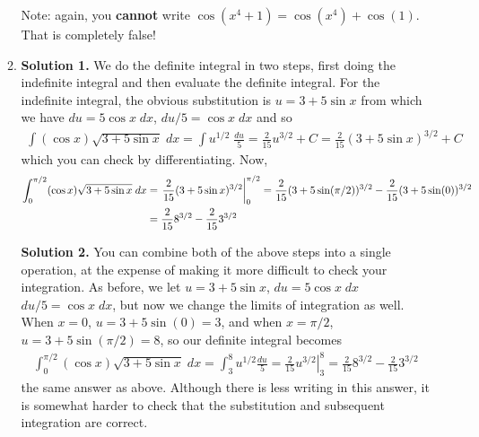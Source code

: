 \documentclass{article}
\begin{document}
\begin{enumerate}
\begin{enumerate}
    Note: again, you \textbf{cannot} write $\cos(x^4+1)=\cos(x^4)+\cos(1)$.
    That is completely false!
  \item \textbf{Solution 1.} We do the definite integral in two steps, first
    doing the indefinite integral and then evaluate the definite integral.
    For the indefinite integral, the obvious substitution is
    $u=3+5\sin x$ from which we have
    $du=5\cos x \; dx$, $du/5 = \cos x \; dx$ and so
    \begin{align*}
      \int (\cos x) \sqrt{3+5\sin x} \; dx
      = \int u^{1/2} \; \frac{du}{5}
      = \frac{2}{15} u^{3/2} + C
      = \frac{2}{15} (3+5\sin x)^{3/2} + C
    \end{align*}
    which you can check by differentiating.  Now,
    \begin{align*}
      \int_0^{\pi/2} (\cos x)\sqrt{3+5\sin x} \; dx
      &= \left. \vphantom{\int} \frac{2}{15} (3+5\sin x)^{3/2} \right|_0^{\pi/2}
      = \frac{2}{15} (3+5\sin(\pi/2))^{3/2} - \frac{2}{15}(3+5\sin(0))^{3/2}
      \\
      &= \frac{2}{15} 8^{3/2} - \frac{2}{15} 3^{3/2}
    \end{align*}

    \textbf{Solution 2.} You can combine both of the above steps into a single
    operation, at the expense of making it more difficult to check your
    integration.  As before, we let $u=3+5\sin x$, $du=5\cos x \; dx$
    $du/5 = \cos x \; dx$, but now we change the limits of integration
    as well.  When $x=0$, $u=3+5\sin(0) = 3$, and when $x=\pi/2$, 
    $u=3+5\sin(\pi/2)=8$, so our definite integral becomes
    \begin{align*}
      \int_0^{\pi/2} (\cos x) \sqrt{3+5\sin x} \; dx
      = \int_3^8 u^{1/2} \frac{du}{5}
      = \left. \frac{2}{15} u^{3/2} \right|_3^8
      = \frac{2}{15} 8^{3/2} - \frac{2}{15} 3^{3/2}
    \end{align*}
    the same answer as above.  Although there is less writing in this answer,
    it is somewhat harder to check that the substitution and subsequent
    integration are correct.
  \end{enumerate}
\end{enumerate}
\end{document}
